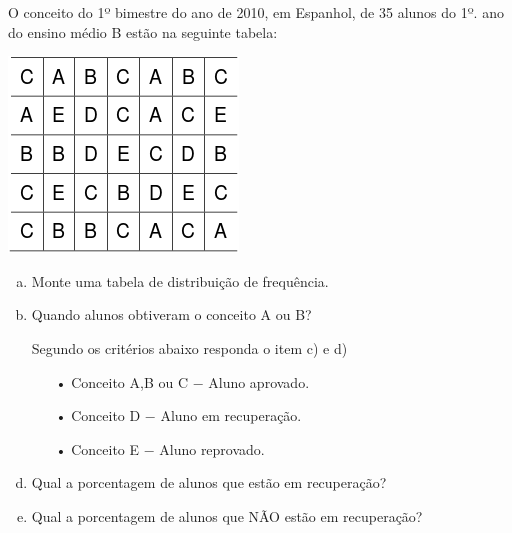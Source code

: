 	\item O conceito do 1º bimestre do ano de 2010, em Espanhol, de 35 alunos do 1º. ano do ensino médio B estão na seguinte tabela:
	\begin{center}
		\includegraphics[scale=0.7]{figuras/fig120.png}
	\end{center}
	\begin{enumerate}[a)]
		\item Monte uma tabela de distribuição de frequência.
		\item Quando alunos obtiveram o conceito A ou B?
		\item[] Segundo os critérios abaixo responda o item c) e d)
			\begin{enumerate}
				\item[•] Conceito A,B ou C $-$ Aluno aprovado.
				\item[•] Conceito D $-$ Aluno em recuperação.
				\item[•] Conceito E $-$ Aluno reprovado.
			\end{enumerate}
		\item Qual a porcentagem de alunos que estão em recuperação?	
		\item Qual a porcentagem de alunos que NÃO estão em recuperação?	
	\end{enumerate}
	

